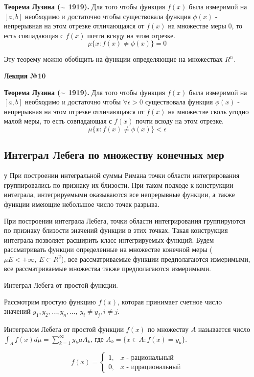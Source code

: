 \documentclass[14pt,a4paper]{extarticle}
\theoremstyle{definition}
\theoremstyle{remark}
\newcommand{\sep}{ , \ \allowbreak }
\renewcommand{\[}{\begin{dmath*}[compact]}
\renewcommand{\]}{\end{dmath*}}
\newcommand{\tth}[1][]{\textbf{Теорема#1.}}
\begin{document}
\tth[ Лузина ($\sim$ 1919)] Для того чтобы функция $f(x)$ была измеримой на $[a,b]$ необходимо и достаточно чтобы существовала функция $\phi(x)$ - непрерывная на этом отрезке отличающаяся от $f(x)$ на множестве меры 0, то есть совпадающая с $f(x)$ почти всюду на этом отрезке.
\[\mu\{x:f(x) \neq \phi (x)\} = 0\]

Эту теорему можно обобщить на функции определяющие на множествах $R^n$.

\textbf{Лекция №10}

\tth[ Лузина ($\sim$ 1919)] Для того чтобы функция $f(x)$ была измеримой на $[a,b]$ необходимо и достаточно чтобы $\forall \epsilon > 0$ существовала функция $\phi(x)$ - непрерывная на этом отрезке отличающаяся от $f(x)$ на множестве сколь угодно малой меры, то есть совпадающая с $f(x)$ почти всюду на этом отрезке.
\[\mu\{x:f(x) \neq \phi (x)\} < \epsilon\]

\subsection{Интеграл Лебега по множеству конечных мер}
у
При построении интегральной суммы Римана точки области интегрирования группировались по признаку их близости. При таком подходе к конструкции интеграла, интегрируемыми оказываются все непрерывные функции, а также функции имеющие небольшое число точек разрыва.

При построении интеграла Лебега, точки области интегрирования группируются по признаку близости значений функции в этих точках. Такая конструкция интеграла позволяет расширить класс интегрируемых функций. Будем рассматривать функции определенные на множестве конечной меры ($\mu E < +\infty \sep E \subset R^2$), все рассматриваемые функции предполагаются измеримыми, все рассматриваемые множества также предполагаются измеримыми.

Интеграл Лебега от простой функции.

Рассмотрим простую функцию $f(x)$, которая принимает счетное число значений $y_1, y_2, \dots, y_n, \dots \sep y_i \neq y_j, i\neq j$.

Интегралом Лебега от простой функции $f(x)$ по множеству $A$ называется число $\int_A f(x) d\mu = \sum_{k=1}^\infty y_k\mu A_k$, где $A_k=\{x\in A:f(x)=y_k\}$.

\[f(x) = \begin{cases} 1, & x\text{ - рациональный} \\ 0, & x\text{ - иррациональный} \end{cases}\]
\end{document}
